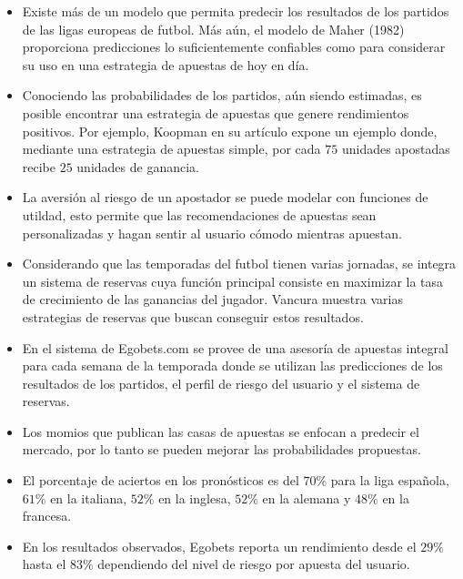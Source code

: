 \begin{itemize}


	\item Existe más de un modelo que permita predecir los resultados de los partidos de las ligas europeas de futbol. Más aún, el modelo de Maher (1982)\cite{maher1982modelling} proporciona predicciones lo suficientemente confiables como para considerar su uso en una estrategia de apuestas de hoy en día.

	\item Conociendo las probabilidades de los partidos, aún siendo estimadas, es posible encontrar una estrategia de apuestas que genere rendimientos positivos. Por ejemplo, Koopman en su artículo \cite{koopman2013dynamic} expone un ejemplo donde, mediante una estrategia de apuestas simple, por cada $75$ unidades apostadas recibe $25$ unidades de ganancia.

	\item La aversión al riesgo de un apostador se puede modelar con funciones de utildad, esto permite que las recomendaciones de apuestas sean personalizadas y hagan sentir al usuario cómodo mientras apuestan.
	
	\item Considerando que las temporadas del futbol tienen varias jornadas, se integra un sistema de reservas cuya función principal consiste en maximizar la tasa de crecimiento de las ganancias del jugador. Vancura \cite{vancura2000finding} muestra varias estrategias de reservas que buscan conseguir estos resultados.

\item En el sistema de Egobets.com se provee de una asesoría de apuestas integral para cada semana de la temporada donde se utilizan las predicciones de los resultados de los partidos, el perfil de riesgo del usuario y el sistema de reservas.

\item Los momios que publican las casas de apuestas se enfocan a predecir el mercado, por lo tanto se pueden mejorar las probabilidades propuestas.

\item  El porcentaje de aciertos en los pronósticos es del $70\%$ para la liga española, $61\%$ en la italiana, $52\%$ en la inglesa, $52\%$ en la alemana y $48\%$ en la francesa.

\item En los resultados observados, Egobets reporta un rendimiento desde el $29\%$ hasta el $83\%$ dependiendo del nivel de riesgo por apuesta del usuario.


\end{itemize}
